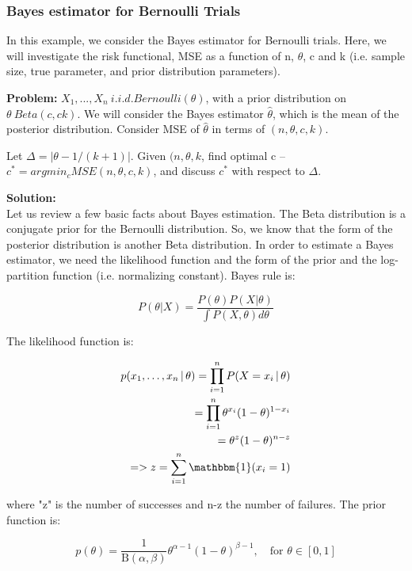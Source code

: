 		\subsubsection{Bayes estimator for Bernoulli Trials}
      In this example, we consider the Bayes estimator for Bernoulli trials. Here, we will investigate the risk functional, MSE as a function of n, $\theta$, c and k (i.e. sample size, true parameter, and prior distribution parameters).

      \textbf{Problem:} $X_1, ..., X_n ~ i.i.d. Bernoulli(\theta)$, with a prior distribution on $\theta ~ Beta(c, ck)$. We will consider the Bayes estimator $\hat{\theta}$, which is the mean of the posterior distribution. Consider MSE of $\hat{\theta}$ in terms of $(n, \theta, c, k)$.

      Let $\Delta = |\theta - 1/(k+1)|$. Given $(n, \theta,k$, find optimal c -- $c^* = argmin_c MSE(n, \theta,c,k)$, and discuss $c^*$ with respect to $\Delta$.

      \textbf{Solution:}\\

      Let us review a few basic facts about Bayes estimation. The Beta distribution is a conjugate prior for the Bernoulli distribution. So, we know that the form of the posterior distribution is another Beta distribution. In order to estimate a Bayes estimator, we need the likelihood function and the form of the prior and the log-partition function (i.e. normalizing constant). Bayes rule is:

      $$P(\theta | X) = \frac{P(\theta) P(X | \theta)}{\int P(X, \theta) d\theta}$$

      The likelihood function is:

      \begin{align}
        p(x_1, \ldots, x_n\, |\, \theta) = \prod_{i=1}^n P(X = x_i\, |\, \theta) \\
          = \prod_{i=1}^n \theta^{x_i} (1-\theta)^{1-x_i} \\
          = \theta^z (1-\theta)^{n-z} \\
          => z = \sum_{i=1}^n \mathbbm{1}(x_i = 1)
      \end{align}

      where "z" is the number of successes and n-z the number of failures. The prior function is:

      $$p(\theta) = \frac{1}{\mathrm{B}(\alpha, \beta)} \theta^{\alpha - 1} (1 - \theta)^{\beta - 1}, \quad \text{for $\theta \in [0,1]$}$$

